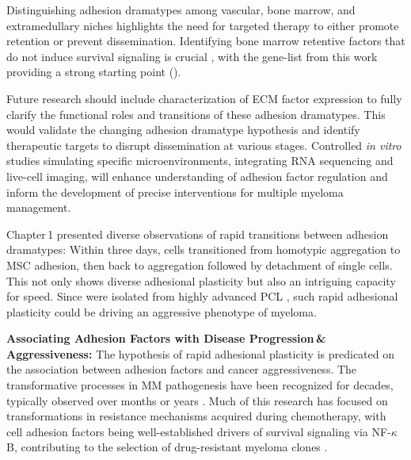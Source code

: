 Distinguishing adhesion dramatypes among vascular, bone marrow, and
extramedullary niches highlights the need for targeted therapy to either promote
retention or prevent dissemination. Identifying bone marrow retentive factors
that do not induce survival signaling is crucial , with the gene-list from this work providing a strong starting point
().

Future research should include characterization of \ac{ECM} factor expression to
fully clarify the functional roles and transitions of these adhesion dramatypes.
This would validate the changing adhesion dramatype hypothesis and identify
therapeutic targets to disrupt dissemination at various stages. Controlled
\textit{in vitro} studies simulating specific microenvironments, integrating RNA
sequencing and live-cell imaging, will enhance understanding of adhesion factor
regulation and inform the development of precise interventions for multiple
myeloma management.



\unnsubsection{\cadplasticitytitle}%
\label{sec:discussion_caddadaptability}%
Chapter\,1 presented diverse observations of rapid transitions between adhesion
dramatypes: Within three days, \INA cells transitioned from homotypic
aggregation to \ac{MSC} adhesion, then back to aggregation followed by
detachment of single cells. This not only shows diverse adhesional
plasticity\footterm{\footadhesionplasticity}{\label{foot:adhesionplasticity}}
but also an intriguing capacity for speed. Since \INA were isolated from highly
advanced \ac{PCL} \cite{burgerGp130RasMediated2001}, such rapid adhesional
plasticity could be driving an aggressive phenotype of myeloma.



\textbf{Associating Adhesion Factors with Disease Progression\,\&\,Aggressiveness:}
The hypothesis of rapid adhesional plasticity is predicated on the association
between adhesion factors and cancer aggressiveness. The transformative processes
in MM pathogenesis have been recognized for decades, typically observed over
months or years \cite{hallekMultipleMyelomaIncreasing1998}. Much of this
research has focused on transformations in resistance mechanisms acquired during
chemotherapy, with cell adhesion factors being well-established drivers of
survival signaling via NF-$\kappa$B, contributing to the selection of
drug-resistant myeloma clones \cite{landowskiCellAdhesionmediatedDrug2003,
      solimandoDrugResistanceMultiple2022}.


